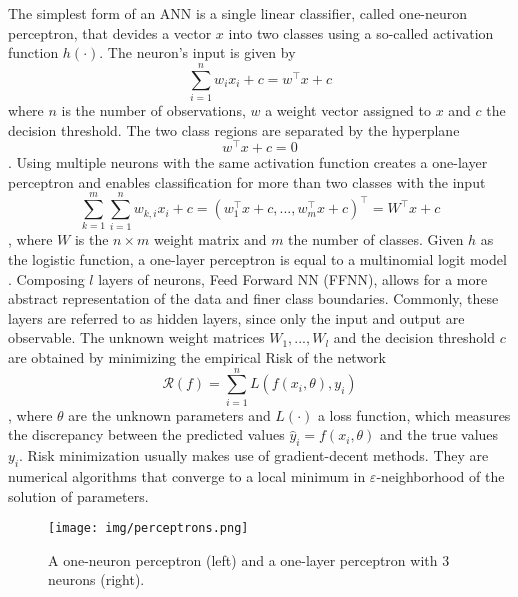 The simplest form of an ANN is a single linear classifier, called one-neuron perceptron, that devides a vector $x$ into two classes using a so-called activation function $h(\cdot)$. The neuron's input is given by
\begin{equation}
	\sum_{i = 1}^{n}{w_i x_i}+c = w^\top x+c
\end{equation}
where $n$ is the number of observations, $w$ a weight vector assigned to $x$ and $c$ the decision threshold. The two class regions are separated by the hyperplane%
\begin{equation}
	w^\top x + c = 0
\end{equation}.
Using multiple neurons with the same activation function creates a one-layer perceptron and enables classification for more than two classes with the input
\begin{equation}
	\sum_{k = 1}^{m}\sum_{i=1}^{n}w_{k,i}x_i + c = (w_1^\top x + c, ..., w_m^\top x + c)^\top = W^\top x + c
\end{equation} 
, where $W$ is the $n\times m$ weight matrix and $m$ the number of classes. Given $h$ as the logistic function, a one-layer perceptron is equal to a multinomial logit model%
. Composing $l$ layers of neurons, Feed Forward NN (FFNN), allows for a more abstract representation of the data and finer class boundaries. Commonly, these layers are referred to as hidden layers, since only the input and output are observable. The unknown weight matrices $W_1, ..., W_l$ and the decision threshold $c$ are obtained by minimizing the empirical Risk of the network
\begin{equation}
	\mathcal{R}(f) = \sum_{i=1}^{n} L(f(x_i, \theta), y_i)
\end{equation}
, where $\theta$ are the unknown parameters and $L(\cdot)$ a loss function, which measures the discrepancy between the predicted values $\hat{y}_i = f(x_i, \theta)$ and the true values $y_i$. Risk minimization usually makes use of gradient-decent methods. They are numerical algorithms that converge to a local minimum in $\varepsilon$-neighborhood of the solution of parameters.
\begin{figure}[h!]
	\centering
	\texttt{[image: img/perceptrons.png]}
	\caption{A one-neuron perceptron (left) and a one-layer perceptron with 3 neurons (right).}
	\label{fig:P}
\end{figure}

